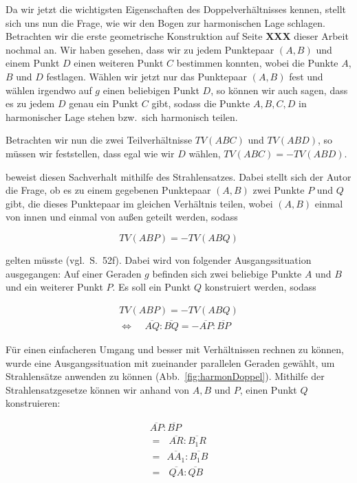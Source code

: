 \documentclass[12pt,a4paper]{article}
\begin{document}
Da wir jetzt die wichtigsten Eigenschaften des Doppelverhältnisses kennen, stellt sich uns nun die Frage, wie wir den Bogen zur harmonischen Lage schlagen. Betrachten wir die erste geometrische Konstruktion auf Seite \textbf{XXX} dieser Arbeit nochmal an. Wir haben gesehen, dass wir zu jedem Punktepaar $(A, B)$ und einem Punkt $D$ einen weiteren Punkt $C$ bestimmen konnten, wobei die Punkte $A$, $B$ und $D$ festlagen. Wählen wir jetzt nur das Punktepaar $(A, B)$ fest und wählen irgendwo auf $g$ einen beliebigen Punkt $D$, so können wir auch sagen, dass es zu jedem $D$ genau ein Punkt $C$ gibt, sodass die Punkte $A, B, C, D$ in harmonischer Lage stehen bzw.~sich harmonisch teilen.

Betrachten wir nun die zwei Teilverhältnisse $TV(A B C)$ und $TV(A B D)$, so müssen wir feststellen, dass egal wie wir $D$ wählen, $TV(A B C) = -TV(A B D)$.

\citep{projektiveGeometrie} beweist diesen Sachverhalt mithilfe des Strahlensatzes. Dabei stellt sich der Autor die Frage, ob es zu einem gegebenen Punktepaar $(A, B)$ zwei Punkte $P$ und $Q$ gibt, die dieses Punktepaar im gleichen Verhältnis teilen, wobei $(A,  B)$ einmal von innen und einmal von außen geteilt werden, sodass

\[TV(A B P) = -TV(A B Q)\]

gelten müsste (vgl.~S.~52f). Dabei wird von folgender Ausgangssituation ausgegangen: Auf einer Geraden $g$ befinden sich zwei beliebige Punkte $A$ und $B$ und ein weiterer Punkt $P$. Es soll ein Punkt $Q$ konstruiert werden, sodass 

\begin{equation*}
\begin{split}
TV(A B P) = -TV(A B Q) \\
\Longleftrightarrow ~~~~~\overline{A Q} : \overline{B Q} = -\overline{A P} : \overline{B P}~~
\end{split}
\end{equation*}

Für einen einfacheren Umgang und besser mit Verhältnissen rechnen zu können, wurde eine Ausgangssituation mit zueinander parallelen Geraden gewählt, um Strahlensätze anwenden zu können (Abb.~\ref{fig:harmonDoppel}). Mithilfe der Strahlensatzgesetze können wir anhand von $A, B$ und $P$, einen Punkt $Q$ konstruieren:

\begin{equation*}
\begin{split}
  \overline{A P} : \overline{B P}~ \\
=~~~\overline{A R} : \overline{B_1 R}  \\
=~~\overline{A A_1} : \overline{B_1 B}  \\
=~~~\overline{Q A} : \overline{Q B}~
\end{split}
\end{equation*}
\end{document}
